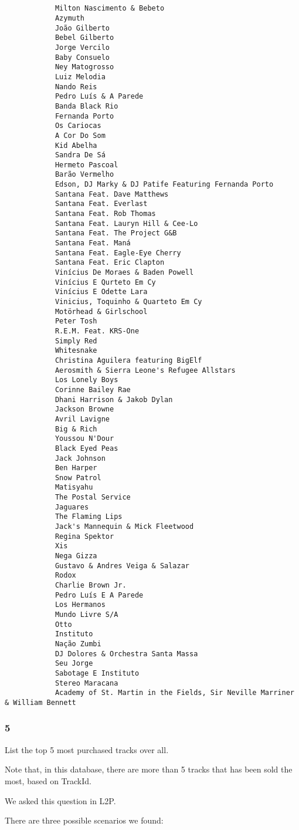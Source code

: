 \documentclass[10pt]{article}
\begin{document}
			\begin{lstlisting}

				
			Milton Nascimento & Bebeto
			Azymuth
			João Gilberto
			Bebel Gilberto
			Jorge Vercilo
			Baby Consuelo
			Ney Matogrosso
			Luiz Melodia
			Nando Reis
			Pedro Luís & A Parede
			Banda Black Rio
			Fernanda Porto
			Os Cariocas
			A Cor Do Som
			Kid Abelha
			Sandra De Sá
			Hermeto Pascoal
			Barão Vermelho
			Edson, DJ Marky & DJ Patife Featuring Fernanda Porto
			Santana Feat. Dave Matthews
			Santana Feat. Everlast
			Santana Feat. Rob Thomas
			Santana Feat. Lauryn Hill & Cee-Lo
			Santana Feat. The Project G&B
			Santana Feat. Maná
			Santana Feat. Eagle-Eye Cherry
			Santana Feat. Eric Clapton
			Vinícius De Moraes & Baden Powell
			Vinícius E Qurteto Em Cy
			Vinícius E Odette Lara
			Vinicius, Toquinho & Quarteto Em Cy
			Motörhead & Girlschool
			Peter Tosh
			R.E.M. Feat. KRS-One
			Simply Red
			Whitesnake
			Christina Aguilera featuring BigElf
			Aerosmith & Sierra Leone's Refugee Allstars
			Los Lonely Boys
			Corinne Bailey Rae
			Dhani Harrison & Jakob Dylan
			Jackson Browne
			Avril Lavigne
			Big & Rich
			Youssou N'Dour
			Black Eyed Peas
			Jack Johnson
			Ben Harper
			Snow Patrol
			Matisyahu
			The Postal Service
			Jaguares
			The Flaming Lips
			Jack's Mannequin & Mick Fleetwood
			Regina Spektor
			Xis
			Nega Gizza
			Gustavo & Andres Veiga & Salazar
			Rodox
			Charlie Brown Jr.
			Pedro Luís E A Parede
			Los Hermanos
			Mundo Livre S/A
			Otto
			Instituto
			Nação Zumbi
			DJ Dolores & Orchestra Santa Massa
			Seu Jorge
			Sabotage E Instituto
			Stereo Maracana
			Academy of St. Martin in the Fields, Sir Neville Marriner & William Bennett
			\end{lstlisting}
			
			\subsubsection*{5}
			
			List the top 5 most purchased tracks over all.\\
			
			\bigskip
			
				Note that, in this database, there are more than 5 tracks that has been sold the most, based on TrackId.
				
				We asked this question in L2P.
				
				\bigskip
				
				
				\hspace{0.5cm}There are three possible scenarios we found:
				
\end{document}

